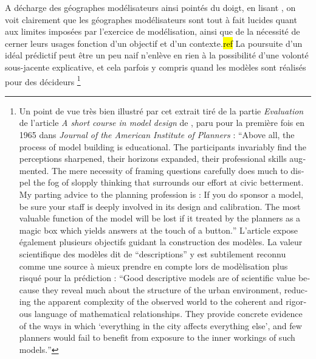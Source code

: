 A décharge des géographes modélisateurs ainsi pointés du doigt, en lisant \autocites{Chorley1967, Harvey1969, Hagget1965}, on voit clairement que les géographes modélisateurs sont tout à fait lucides quant aux limites imposées par l'exercice de modélisation, ainsi que de la nécessité de cerner leurs usages fonction d'un objectif et d'un contexte.\hl{ref} La poursuite d'un idéal prédictif peut être un peu naif n'enlève en rien à la possibilité d'une volonté sous-jacente explicative, et cela parfois y compris quand les modèles sont réalisés pour des décideurs \footnote{ Un point de vue très bien illustré par cet extrait tiré de la partie \textit{Evaluation} de l'article \textit{A short course in model design} de \textcite[62]{Lowry1968}, paru pour la première fois en 1965 dans \textit{Journal of the American Institute of Planners} : \foreignquote{english}{Above all, the process of model building is educational. The participants invariably find the perceptions sharpened, their horizons expanded, their professional skills augmented. The mere necessity of framing questions carefully does much to dispel the fog of slopply thinking that surrounds our effort at civic betterment. My parting advice to the planning profession is : If you do sponsor a model, be sure your staff is deeply involved in its design and calibration. The most valuable function of the model will be lost if it treated by the planners as a magic box which yields answers at the touch of a button.} L'article expose également plusieurs objectifs guidant la construction des modèles. La valeur scientifique des modèles dit de \enquote{descriptions} y est subtilement reconnu comme une source à mieux prendre en compte lors de modèlisation plus risqué pour la prédiction : \foreignquote{english}{Good descriptive models are of scientific value because they reveal much about the structure of the urban environment, reducing the apparent complexity of the observed world to the coherent and rigorous language of mathematical relationships. They provide concrete evidence of the ways in which \enquote{everything in the city affects everything else}, and few planners would fail to benefit from exposure to the inner workings of such models.} }

